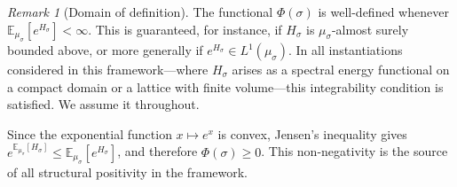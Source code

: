 \documentclass[12pt,a4paper]{article}
\theoremstyle{definition}
\theoremstyle{remark}
\newtheorem{remark}[theorem]{Remark}
\newcommand{\EE}{\mathbb{E}}
\begin{document}
\begin{remark}[Domain of definition]
\label{rem:rfep-domain}
The functional $\Phi(\sigma)$ is well-defined whenever $\EE_{\mu_\sigma}[e^{H_\sigma}] < \infty$. This is guaranteed, for instance, if $H_\sigma$ is $\mu_\sigma$-almost surely bounded above, or more generally if $e^{H_\sigma} \in L^1(\mu_\sigma)$. In all instantiations considered in this framework---where $H_\sigma$ arises as a spectral energy functional on a compact domain or a lattice with finite volume---this integrability condition is satisfied. We assume it throughout.
\end{remark}

\noindent
Since the exponential function $x \mapsto e^x$ is convex, Jensen's inequality gives $e^{\EE_{\mu_\sigma}[H_\sigma]} \le \EE_{\mu_\sigma}[e^{H_\sigma}]$, and therefore $\Phi(\sigma) \ge 0$. This non-negativity is the source of all structural positivity in the framework.
\end{document}
